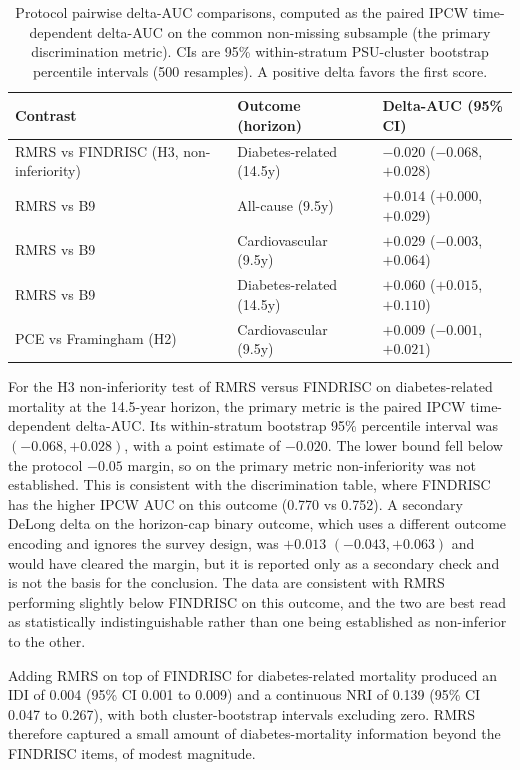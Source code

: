 \documentclass[11pt]{article}
\begin{document}
\begin{table}[h]
\centering
\caption{Protocol pairwise delta-AUC comparisons, computed as the paired IPCW time-dependent delta-AUC on the common non-missing subsample (the primary discrimination metric). CIs are 95\% within-stratum PSU-cluster bootstrap percentile intervals (500 resamples). A positive delta favors the first score.}
\label{tab:pairwise}
\begin{tabular}{lll}
\toprule
Contrast & Outcome (horizon) & Delta-AUC (95\% CI) \\
\midrule
RMRS vs FINDRISC (H3, non-inferiority) & Diabetes-related (14.5y) & $-0.020$ ($-0.068$, $+0.028$) \\
RMRS vs B9 & All-cause (9.5y) & $+0.014$ ($+0.000$, $+0.029$) \\
RMRS vs B9 & Cardiovascular (9.5y) & $+0.029$ ($-0.003$, $+0.064$) \\
RMRS vs B9 & Diabetes-related (14.5y) & $+0.060$ ($+0.015$, $+0.110$) \\
PCE vs Framingham (H2) & Cardiovascular (9.5y) & $+0.009$ ($-0.001$, $+0.021$) \\
\bottomrule
\end{tabular}
\end{table}

For the H3 non-inferiority test of RMRS versus FINDRISC on diabetes-related mortality at the 14.5-year horizon, the primary metric is the paired IPCW time-dependent delta-AUC. Its within-stratum bootstrap 95\% percentile interval was $(-0.068, +0.028)$, with a point estimate of $-0.020$. The lower bound fell below the protocol $-0.05$ margin, so on the primary metric non-inferiority was not established. This is consistent with the discrimination table, where FINDRISC has the higher IPCW AUC on this outcome (0.770 vs 0.752). A secondary DeLong delta on the horizon-cap binary outcome, which uses a different outcome encoding and ignores the survey design, was $+0.013$ $(-0.043, +0.063)$ and would have cleared the margin, but it is reported only as a secondary check and is not the basis for the conclusion. The data are consistent with RMRS performing slightly below FINDRISC on this outcome, and the two are best read as statistically indistinguishable rather than one being established as non-inferior to the other.

Adding RMRS on top of FINDRISC for diabetes-related mortality produced an IDI of 0.004 (95\% CI 0.001 to 0.009) and a continuous NRI of 0.139 (95\% CI 0.047 to 0.267), with both cluster-bootstrap intervals excluding zero. RMRS therefore captured a small amount of diabetes-mortality information beyond the FINDRISC items, of modest magnitude.
\end{document}

